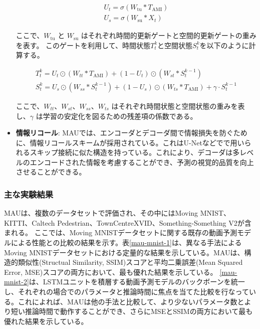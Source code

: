 \begin{itemize}
        \begin{align}
          U_t = \sigma(W_{\text{tu}} \ast T_{\text{AMI}}) \\
          U_s = \sigma(W_{\text{su}} \ast X_t) 
        \end{align}
        
        ここで、\( W_{\text{tu}} \) と \( W_{\text{su}} \) はそれぞれ時間的更新ゲートと空間的更新ゲートの重みを表す。
        このゲートを利用して、時間状態\( T_{t}^{k} \)と空間状態\( S_{t}^{k} \)を以下のように計算する。
        
        \begin{align}
        T_{t}^{k} = U_t \odot (W_{tt} \ast T_{\text{AMI}}) + (1 - U_t) \odot (W_{st} \ast S_{t}^{k-1}) \\
        S_{t}^{k} = U_s \odot (W_{ss} \ast S_{t}^{k-1}) + (1 - U_s) \odot (W_{ts} \ast T_{\text{AMI}}) + \gamma \cdot S_{t}^{k-1}
        \end{align}
        
        ここで、\( W_{tt} \)、\( W_{st} \)、\( W_{ss} \)、\( W_{ts} \) はそれぞれ時間状態と空間状態の重みを表し、\( \gamma \) は学習の安定化を図るための残差項の係数である。

        \item \textbf{情報リコール}: 
          MAUでは、エンコーダとデコーダ間で情報損失を防ぐために、情報リコールスキームが採用されている。これはU-Netなどでで用いられるスキップ接続に似た構造を持っている。これにより、デコーダは多レベルのエンコードされた情報を考慮することができ、予測の視覚的品質を向上させることができる。    


       \end{itemize}

      \subsubsection{主な実験結果}
        MAUは、複数のデータセットで評価され、その中にはMoving MNIST、KITTI、Caltech Pedestrian、TownCentreXVID、Something-Something V2が含まれる。
        ここでは、Moving MNISTデータセットに関する既存の動画予測モデルによる性能との比較の結果を示す。表\ref{mau-mnist-1}は、異なる手法によるMoving MNISTデータセットにおける定量的な結果を示している。MAUは、構造的類似性(Structual Similarity, SSIM)スコアと平均二乗誤差(Mean Squared Error, MSE)スコアの両方において、最も優れた結果を示している。
        \ref{mau-mnist-2}は、LSTMユニットを積層する動画予測モデルのバックボーンを統一し、それぞれの場合でのパラメータと推論時間に焦点を当てた比較を行なっている。これによれば、MAUは他の手法と比較して、より少ないパラメータ数とより短い推論時間で動作することができ、さらにMSEとSSIMの両方において最も優れた結果を示している。

